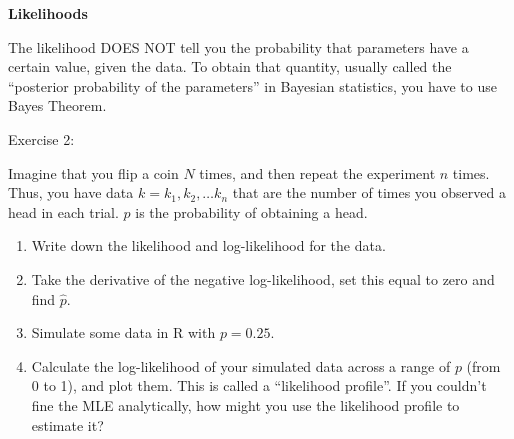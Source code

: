 \documentclass[12pt,xcolor=svgnames]{beamer}
\newcommand{\rd}{\color{red}}
\newcommand{\bl}{\color{blue}}
\newcommand{\theme}{\color{FireBrick}}
\newcommand{\sk}{\vspace{.4cm}}
\newcommand{\nochap}{\vspace{0.5cm}}
\newcommand{\chap}[1]{{\theme \Large \bf #1} \sk}
\begin{document}
\begin{frame}
\chap{Likelihoods}

The likelihood {\rd DOES NOT} tell you the probability that parameters have a certain value, given the data. To obtain that quantity, usually called the ``posterior probability of the parameters'' in Bayesian statistics, you have to use Bayes Theorem. 


\end{frame}

\begin{frame}
\nochap

{\bl Exercise 2:}\\

{\scriptsize
Imagine that you flip a coin $N$ times, and then repeat the experiment $n$ times. Thus, you have data $k=k_1, k_2, \dots k_n$ that are the number of times you observed a head in each trial. $p$ is the probability of obtaining a head. 
\begin{enumerate}
\item Write down the likelihood and log-likelihood for the data.
\item Take the derivative of the negative log-likelihood, set this equal to zero and find $\hat{p}$. 
\item Simulate some data in {\sf R} with $p=0.25$.
\item Calculate the log-likelihood of your simulated data across a range of $p$ (from 0 to 1), and plot them. This is called a ``likelihood profile''. If you couldn't fine the MLE analytically, how might you use the likelihood profile to estimate it?
\end{enumerate}
}
\end{frame}
\end{document}
